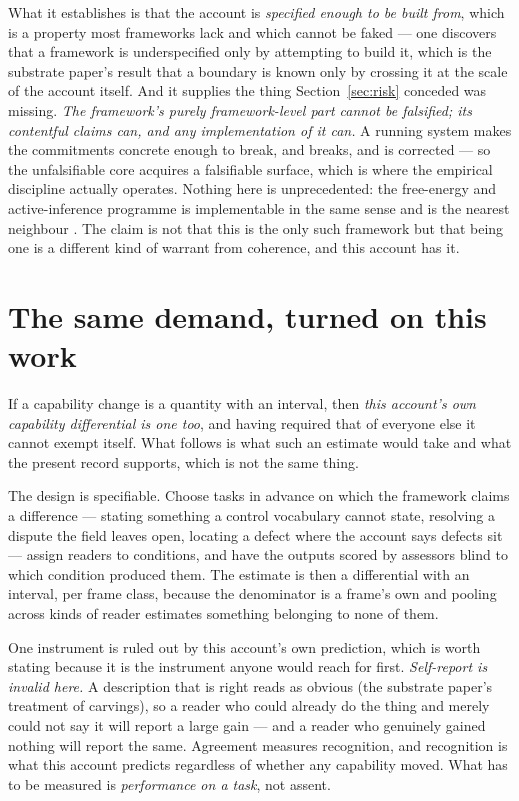 \documentclass[11pt,a4paper]{article}
\theoremstyle{remark}\newtheorem{remark}[definition]{Remark}
\begin{document}
What it establishes is that the account is \emph{specified enough to be built from}, which is a
property most frameworks lack and which cannot be faked --- one discovers that a framework is
underspecified only by attempting to build it, which is the substrate paper's result that a boundary is known only by crossing it at the
scale of the account itself. And it supplies the thing Section~\ref{sec:risk} conceded was
missing. \emph{The framework's purely framework-level part cannot be falsified; its contentful claims can, and any implementation of it can.} A running system makes
the commitments concrete enough to break, and breaks, and is corrected --- so the unfalsifiable core
acquires a falsifiable surface, which is where the empirical discipline actually operates. Nothing here
is unprecedented: the free-energy and active-inference programme is implementable in the same sense and
is the nearest neighbour \citep{friston2010}. The claim is not that this is the only such framework but
that being one is a different kind of warrant from coherence, and this account has it.

\section{The same demand, turned on this work}\label{sec:turned}
If a capability change is a quantity with an
interval, then \emph{this account's own capability differential is one too}, and having required that
of everyone else it cannot exempt itself. What follows is what such an estimate would take and what the
present record supports, which is not the same thing.

The design is specifiable. Choose tasks in advance on which the framework claims a difference ---
stating something a control vocabulary cannot state, resolving a dispute the field leaves open,
locating a defect where the account says defects sit --- assign readers to conditions, and have the
outputs scored by assessors blind to which condition produced them. The estimate is then a differential
with an interval, per frame class, because the denominator is a frame's own and pooling across kinds of
reader estimates something belonging to none of them.

One instrument is ruled out by this account's own prediction, which is worth stating because it is the
instrument anyone would reach for first. \emph{Self-report is invalid here.} A description that is
right reads as obvious (the substrate paper's treatment of carvings), so a reader who could already do the thing and
merely could not say it will report a large gain --- and a reader who genuinely gained nothing will
report the same. Agreement measures recognition, and recognition is what this account predicts
regardless of whether any capability moved. What has to be measured is \emph{performance on a task},
not assent.
\end{document}
